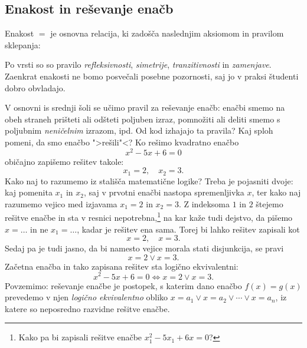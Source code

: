 \subsection{Enakost in reševanje enačb}
\label{sec:enakost}

Enakost $=$ je osnovna relacija, ki zadošča naslednjim aksiomom in
pravilom sklepanja:
%
%
Po vrsti so so pravilo \emph{refleksivnosti}, \emph{simetrije},
\emph{tranzitivnosti} in \emph{zamenjave}. Zaenkrat enakosti ne bomo
posvečali posebne pozornosti, saj jo v praksi študenti dobro
obvladajo.

V osnovni is srednji šoli se učimo pravil za reševanje enačb: enačbi
smemo na obeh straneh prišteti ali odšteti poljuben izraz, pomnožiti
ali deliti smemo s poljubnim \emph{neničelnim} izrazom, ipd. Od kod
izhajajo ta pravila? Kaj sploh pomeni, da smo enačbo ">rešili"<? Ko
rešimo kvadratno enačbo
%
\begin{equation*}
  x^2 - 5 x + 6 = 0
\end{equation*}
%
običajno zapišemo rešitev takole:
%
\begin{equation*}
  x_1 = 2, \quad x_2 = 3.
\end{equation*}
%
Kako naj to razumemo iz stališča matematične logike? Treba je
pojasniti dvoje: kaj pomenita $x_1$ in $x_2$, saj v prvotni enačbi
nastopa spremenljivka $x$, ter kako naj razumemo vejico med izjavama
$x_1 = 2$ in $x_2 = 3$. Z indeksoma $1$ in $2$ štejemo rešitve enačbe
in sta v resnici nepotrebna,\footnote{Kako pa bi zapisali rešitve
  enačbe $x_1^2 - 5 x_1 + 6 x = 0$?} na kar kaže tudi dejstvo, da
pišemo $x = \ldots$ in ne $x_1 = \ldots$, kadar je rešitev ena sama.
Torej bi lahko rešitev zapisali kot
%
\begin{equation*}
  x = 2, \quad x = 3.
\end{equation*}
%
Sedaj pa je tudi jasno, da bi namesto vejice morala stati disjunkcija,
se pravi
%
\begin{equation*}
  x = 2 \lor x = 3.
\end{equation*}
%
Začetna enačba in tako zapisana rešitev sta logično ekvivalentni:
%
\begin{equation*}
  x^2 - 5 x + 6 = 0 \iff
  x = 2 \lor x = 3.
\end{equation*}
%
Povzemimo: reševanje enačbe je postopek, s katerim dano enačbo $f(x) =
g(x)$ prevedemo v njen \emph{logično ekvivalentno} obliko $x = a_1
\lor x = a_2 \lor \cdots \lor x = a_n$, iz katere so neposredno razvidne
rešitve enačbe.

